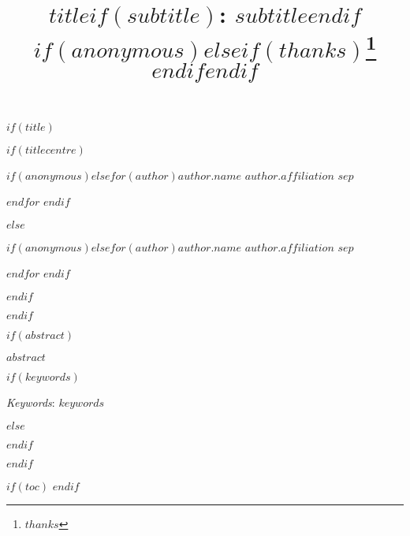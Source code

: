 \documentclass[$if(fontsize)$$fontsize$,$endif$$if(lang)$$babel-lang$,$endif$$if(papersize)$$papersize$,$endif$$for(classoption)$$classoption$$sep$,$endfor$]{$documentclass$}
\title{$title$$if(subtitle)$: $subtitle$$endif$ $if(anonymous)$$else$$if(thanks)$\thanks{$thanks$} $endif$$endif$ }
\date{}
\renewenvironment{abstract}
 {{%
    \setlength{\leftmargin}{0mm}
    \setlength{\rightmargin}{\leftmargin}%
  }%
  \relax}
 {\endlist}
\begin{document}




$if(title)$
\maketitle

{%
\thispagestyle{plain}
{ \selectfont
\maketitle  %
}

$if(titlecentre)$
\begin{center}
{
   \vskip 13.5pt\relax \normalsize\fontsize{14}{14}
$if(anonymous)$\hfill $else$$for(author)$\textbf{$author.name$} \hskip 15pt \emph{\small $author.affiliation$}  $sep$ \par $endfor$ $endif$
}
\end{center}
$else$
{
   \vskip 13.5pt\relax \normalsize\fontsize{14}{14}
$if(anonymous)$\hfill $else$$for(author)$\textbf{$author.name$} \hskip 15pt \emph{\small $author.affiliation$}  $sep$ \par $endfor$ $endif$
}
$endif$
}

$endif$



$if(abstract)$

\begin{abstract}

    \hbox{\vrule height .2pt width 39.14pc}

    \vskip 8.5pt %

\noindent $abstract$

$if(keywords)$

\vskip 8.5pt \noindent \emph{Keywords}: $keywords$ \par

    \hbox{\vrule height .2pt width 39.14pc}


$else$

    \hbox{\vrule height .2pt width 39.14pc}

$endif$

\end{abstract}

$endif$

\vskip 6.5pt

$if(toc)$
{
\hypersetup{linkcolor=black}
\setcounter{tocdepth}{$toc-depth$}
\tableofcontents
}
$endif$
\end{document}
